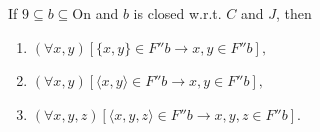 If $9 \subseteq b \subseteq \mathrm{On}$ and $b$ is closed w.r.t. $C$ and $J$, then
\begin{enumerate}
\item $(\forall x, y)[\{x, y\} \in F''b \rightarrow x, y \in F''b],$
\item $(\forall x, y)[\langle x, y \rangle \in F''b \rightarrow x, y \in F''b],$
\item $(\forall x, y, z)[\langle x, y, z \rangle \in F''b \rightarrow x, y, z \in F''b].$
\end{enumerate}
